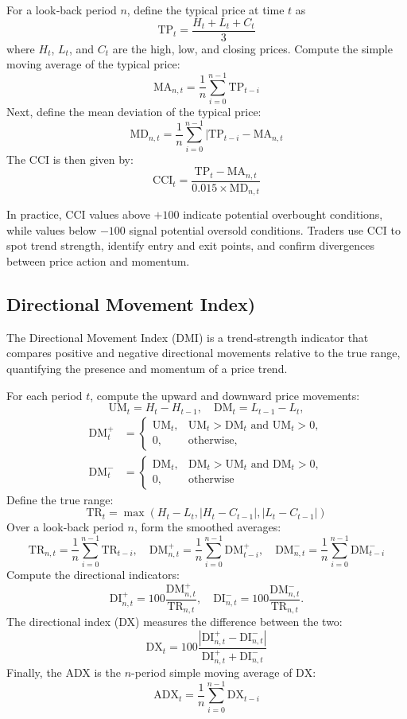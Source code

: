 For a look‐back period \(n\), define the typical price at time \(t\) as
\[\mathrm{TP}_t = \frac{H_t + L_t + C_t}{3}\]
where \(H_t\), \(L_t\), and \(C_t\) are the high, low, and closing prices.  Compute the simple moving average of the typical price:
\[\mathrm{MA}_{n,t} = \frac{1}{n} \sum_{i=0}^{n-1} \mathrm{TP}_{t-i}\]
Next, define the mean deviation of the typical price:
\[\mathrm{MD}_{n,t} = \frac{1}{n} \sum_{i=0}^{n-1} |\mathrm{TP}_{t-i} - \mathrm{MA}_{n,t}\]
The CCI is then given by:
\[\mathrm{CCI}_t = \frac{\mathrm{TP}_t - \mathrm{MA}_{n,t}}{0.015 \times \mathrm{MD}_{n,t}}\]

In practice, \gls{CCI} values above \(+100\) indicate potential overbought conditions, while values below \(-100\) signal potential oversold conditions. Traders use \gls{CCI} to spot trend strength, identify entry and exit points, and confirm divergences between price action and momentum.

\subsection{Directional Movement Index)}
The Directional Movement Index (DMI) is a trend‐strength indicator that compares positive and negative directional movements relative to the true range, quantifying the presence and momentum of a price trend.

For each period \(t\), compute the upward and downward price movements:
\[
\mathrm{UM}_t = H_t - H_{t-1}, 
\quad
\mathrm{DM}_t = L_{t-1} - L_t,
\]
\[
\begin{aligned}
\mathrm{DM}^+_t &= 
  \begin{cases}
    \mathrm{UM}_t, & \mathrm{UM}_t > \mathrm{DM}_t \text{ and } \mathrm{UM}_t > 0,\\
    0, & \text{otherwise},
  \end{cases}
  \\
\mathrm{DM}^-_t &= 
  \begin{cases}
    \mathrm{DM}_t, & \mathrm{DM}_t > \mathrm{UM}_t \text{ and } \mathrm{DM}_t > 0,\\
    0, & \text{otherwise}
  \end{cases}
\end{aligned}
\]
Define the true range:
\[\mathrm{TR}_t = \max(H_t - L_t, |H_t - C_{t-1}|, |L_t - C_{t-1}|)\]
Over a look‐back period \(n\), form the smoothed averages:
\[\mathrm{TR}_{n,t} = \frac{1}{n} \sum_{i=0}^{n-1} \mathrm{TR}_{t-i}, \quad \mathrm{DM}^+_{n,t} = \frac{1}{n} \sum_{i=0}^{n-1}\mathrm{DM}^+_{t-i}, \quad \mathrm{DM}^-_{n,t} = \frac{1}{n} \sum_{i=0}^{n-1} \mathrm{DM}^-_{t-i}\]
Compute the directional indicators:
\[\mathrm{DI}^+_{n,t} =100 \frac{\mathrm{DM}^+_{n,t}}{\mathrm{TR}_{n,t}}, \quad \mathrm{DI}^-_{n,t} = 100 \frac{\mathrm{DM}^-_{n,t}}{\mathrm{TR}_{n,t}}.\]
The directional index (DX) measures the difference between the two:
\[\mathrm{DX}_t = 100 \frac{|\mathrm{DI}^+_{n,t} - \mathrm{DI}^-_{n,t}|}{\mathrm{DI}^+_{n,t} + \mathrm{DI}^-_{n,t}}\]
Finally, the \gls{ADX} is the \(n\)-period simple moving average of \(\mathrm{DX}\):
\[\mathrm{ADX}_t = \frac{1}{n} \sum_{i=0}^{n-1} \mathrm{DX}_{t-i}\]

